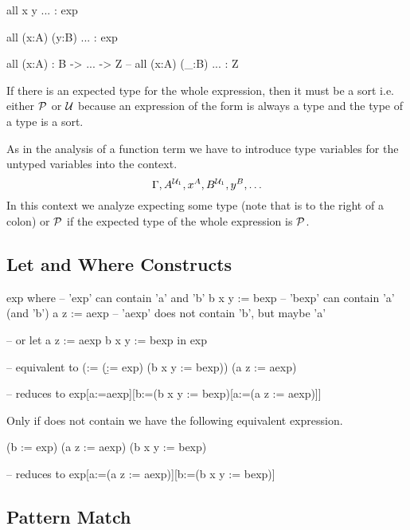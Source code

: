 \begin{alba}
  all x y ... : exp

  all (x:A) (y:B) ... : exp

  all (x:A) : B -> ... -> Z        -- all (x:A) (_:B) ... : Z
\end{alba}

If there is an expected type for the whole expression, then it must be a sort
i.e. either ${\cal{P}}$ or ${\cal{U}}$ because an expression of the form  is always a type and the type of a type is a sort.

As in the analysis of a function term we have to introduce type variables for
the untyped variables into the context.
$$
\Gamma, A^{{\cal{U}}_1}, x^A, B^{{\cal{U}}_1}, y^B, \ldots
$$
%
In this context we analyze  expecting some type (note that
 is to the right of a colon) or ${\cal{P}}$ if the expected type of the
whole expression is ${\cal{P}}$.





\vskip 5mm
\subsection{Let and Where Constructs}



\begin{alba}
  exp where               -- 'exp' can contain 'a' and 'b'
    b x y := bexp         -- 'bexp' can contain 'a' (and 'b')
    a z := aexp           -- 'aexp' does not contain 'b', but maybe 'a'

  -- or
  let
    a z := aexp
    b x y := bexp
  in
    exp

  -- equivalent to
  (\a := (\b := exp) (b x y := bexp)) (a z := aexp)

  -- reduces to
  exp[a:=aexp][b:=(b x y := bexp)[a:=(a z := aexp)]]
\end{alba}

Only if  does not contain  we have the following equivalent
expression.

\begin{alba}
  (\a b := exp) (a z := aexp) (b x y := bexp)

  -- reduces to
  exp[a:=(a z := aexp)][b:=(b x y := bexp)]
\end{alba}



\vskip 5mm
\subsection{Pattern Match}

